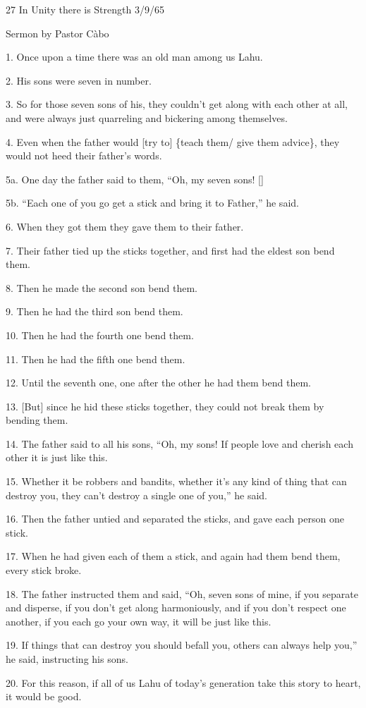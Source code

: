 
27 In Unity there is Strength 3/9/65

Sermon by Pastor Càbo

1. Once upon a time there was an old man among us Lahu.

2. His sons were seven in number.

3. So for those seven sons of his, they couldn't get along with each other at all,
and were always just quarreling and bickering among themselves.

4. Even when the father would [try to] \{teach them/ give them advice\}, they would
not heed their father's words.

5a. One day the father said to them, ``Oh, my seven sons! []

5b. ``Each one of you go get a stick and bring it to Father,'' he said.

6. When they got them they gave them to their father.

7. Their father tied up the sticks together, and first had the eldest son bend
them.

8. Then he made the second son bend them.

9. Then he had the third son bend them.

10. Then he had the fourth one bend them.

11. Then he had the fifth one bend them.

12. Until the seventh one, one after the other he had them bend them.

13. [But] since he hid these sticks together, they could not break them by bending
them.

14. The father said to all his sons, ``Oh, my sons! If people love and cherish
each other it is just like this.

15. Whether it be robbers and bandits, whether it's any kind of thing that can
destroy you, they can't destroy a single one of you,'' he said.

16. Then the father untied and separated the sticks, and gave each person one stick.

17. When he had given each of them a stick, and again had them bend them, every
stick broke.

18. The father instructed them and said, ``Oh, seven sons of mine, if you separate
and disperse, if you don't get along harmoniously, and if you don't respect one
another, if you each go your own way, it will be just like this.

19. If things that can destroy you should befall you, others can always help you,''
he said, instructing his sons.

20. For this reason, if all of us Lahu of today's generation take this story to
heart, it would be good.

